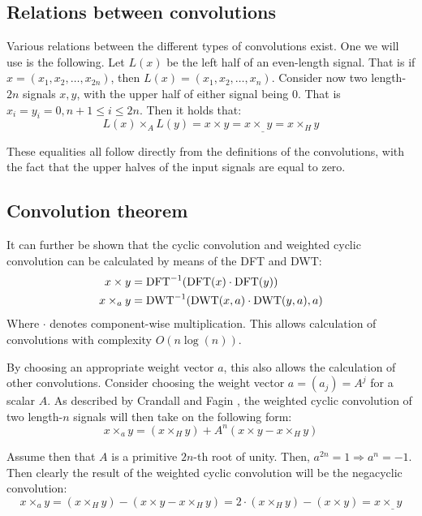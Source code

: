 \subsection{Relations between convolutions}
\label{sec:relations_between_convolutions}

Various relations between the different types of convolutions exist. One we
will use is the following. Let $L(x)$ be the left half of an even-length
signal. That is if $x = (x_1, x_2, \ldots, x_{2n})$, then $L(x) = (x_1, x_2,
\ldots, x_n)$. Consider now two length-$2n$ signals $x, y$, with the upper half
of either signal being $0$. That is $x_i = y_i = 0, n + 1 \leq i \leq 2n$. Then
it holds that: \autocite{crandallPrimeNumbersComputational2005}
\[
		L(x) \times_A L(y) = x \times y = x \times_\_ y = x \times_H y
\]

These equalities all follow directly from the definitions of the convolutions,
with the fact that the upper halves of the input signals are equal to zero.

\subsection{Convolution theorem}
\label{sec:convolution_theorem}

It can further be shown that the cyclic convolution and weighted cyclic
convolution can be calculated by means of the DFT and DWT:
\autocite{crandallPrimeNumbersComputational2005}
\begin{align*}
		x \times y & = \operatorname{DFT}^{-1}(\operatorname{DFT}(x) \cdot \operatorname{DFT}(y)) \\
		x \times_a y & = \operatorname{DWT}^{-1}(\operatorname{DWT}(x, a) \cdot \operatorname{DWT}(y, a), a)
\end{align*}
Where $\cdot$ denotes component-wise multiplication. This allows calculation of
convolutions with complexity $O(n \log(n))$.

By choosing an appropriate weight vector $a$, this also allows the calculation
of other convolutions. Consider choosing the weight vector $a = (a_j) = A^j$
for a scalar $A$. As described by Crandall and Fagin
\autocite{crandallDiscreteWeightedTransforms1994}, the weighted cyclic
convolution of two length-$n$ signals will then take on the following form:
\[
		x \times_a y = (x \times_H y)  + A^n (x \times y - x \times_H y)
\]

Assume then that $A$ is a primitive $2n$-th root of unity. Then, $a^{2n} = 1
\Rightarrow a^n = -1$. Then clearly the result of the weighted cyclic
convolution will be the negacyclic convolution:
\[
		x \times_a y = (x \times_H y) - (x \times y - x \times_H y) = 2 \cdot (x \times_H y) - (x \times y) = x \times_\_ y
\]
